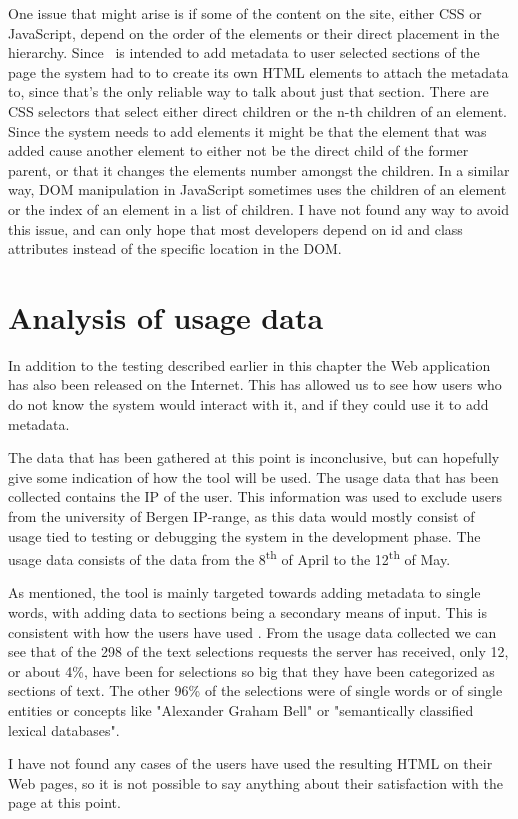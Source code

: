One issue that might arise is if some of the content on the site, either CSS or JavaScript,
depend on the order of the elements or their direct placement in the hierarchy.
Since \theartefact\ is intended to add metadata to user selected sections of the page the system had to  to create its own
HTML elements to attach the metadata to, since that's the only reliable way to talk about just that section.
There are CSS selectors that select either direct children or the n-th children of an element.
Since the system needs to add elements it might be that the element that was added cause another element to either not be the direct
child of the former parent, or that it changes the elements number amongst the children.
In a similar way, DOM manipulation in JavaScript sometimes uses the children of an element or the index of an element
in a list of children.
I have not found any way to avoid this issue,
and can only hope that most developers depend on id and class attributes instead of the specific location in the DOM.

\section{Analysis of usage data}
In addition to the testing described earlier in this chapter the Web application  has also been released on the Internet.
This has allowed us to see how users who do not know the system would interact with it,
and if they could use it to add metadata.

The data that has been gathered at this point is inconclusive, but can hopefully give some indication of how the tool will be used.
The usage data that has been collected contains the IP of the user.
This information was used to exclude users from the university of Bergen IP-range,
as this data would mostly consist of usage tied to testing or debugging the system in the development phase.
The usage data consists of the data from the 8\textsuperscript{th}	 of April to the 12\textsuperscript{th} of May.

As mentioned, the tool is mainly targeted towards adding metadata to single words, with adding data to sections being
a secondary means of input.
This is consistent with how the users have used \theartefact.
From the usage data collected we can see that of the 298 of the text selections requests the server has received,
only 12, or about 4\%, have been for selections so big that they have been categorized as sections of text.
The other 96\% of the selections were of single words or of single entities or concepts like "Alexander Graham Bell" or
"semantically classified lexical databases".

I have not found any cases of the users have used the resulting HTML on their Web pages,
so it is not possible to say anything about their satisfaction with the page at this point.
